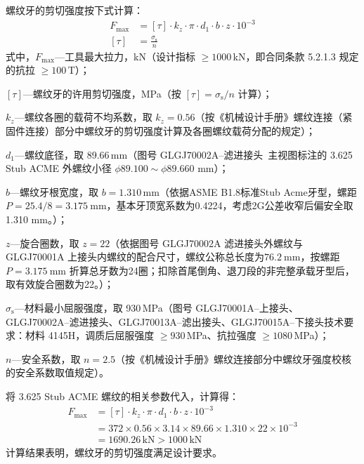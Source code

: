 螺纹牙的剪切强度按下式计算：
\begin{equation}
    \begin{aligned}
        F_{\max} &= [\tau] \cdot k_z \cdot \pi \cdot d_1 \cdot b \cdot z \cdot 10^{-3} \\
        [\tau] &= \frac{\sigma_{\mathrm{s}}}{n}
    \end{aligned}
\end{equation}
式中，$F_{\max}$---工具最大拉力，kN（设计指标 $\ge 1000$\,kN，即合同条款 5.2.1.3 规定的抗拉 $\ge 100$\,T）；

$[\tau]$---螺纹牙的许用剪切强度，MPa（按 $[\tau]=\sigma_{\mathrm{s}}/n$ 计算）；

$k_z$---螺纹各圈的载荷不均系数，取 $k_z = 0.56$（按《机械设计手册》螺纹连接（紧固件连接）部分中螺纹牙的剪切强度计算及各圈螺纹载荷分配的规定\cite{ref26}）；

$d_1$---螺纹底径，取 89.66\,mm（图号 GLGJ70002A--滤进接头\ 主视图标注的 3.625 Stub ACME 外螺纹小径 $\phi 89.100\sim \phi 89.660$ mm）；

$b$---螺纹牙根宽度，取 $b = 1.310\,\text{mm}$（依据ASME B1.8标准Stub Acme牙型，螺距 $P=25.4/8=3.175\ \mathrm{mm}$，基本牙顶宽系数为0.4224，考虑2G公差收窄后偏安全取1.310 mm。）；

$z$---旋合圈数，取 $z = 22$（依据图号 GLGJ70002A 滤进接头外螺纹与 GLGJ70001A 上接头内螺纹的配合尺寸，螺纹公称总长度为$76.2\ \mathrm{mm}$，按螺距 $P=3.175\ \mathrm{mm}$ 折算总牙数为24圈；扣除首尾倒角、退刀段的非完整承载牙型后，取有效旋合圈数为22。）；

$\sigma_{\mathrm{s}}$---材料最小屈服强度，取 930\,MPa（图号 GLGJ70001A--上接头、GLGJ70002A--滤进接头、GLGJ70013A--滤出接头、GLGJ70015A--下接头技术要求：材料 4145H，调质后屈服强度 $\ge 930$\,MPa、抗拉强度 $\ge 1080$\,MPa）；

$n$---安全系数，取 $n = 2.5$（按《机械设计手册》螺纹连接部分中螺纹牙强度校核的安全系数取值规定\cite{ref26}）。

将 3.625 Stub ACME 螺纹的相关参数代入，计算得：
\begin{equation}
    \begin{aligned}
        F_{\max} &= [\tau] \cdot k_z \cdot \pi \cdot d_1 \cdot b \cdot z \cdot 10^{-3} \\
                &= 372 \times 0.56 \times 3.14 \times 89.66 \times 1.310 \times 22 \times 10^{-3} \\
                &= 1690.26\,\text{kN} > 1000\,\text{kN}
    \end{aligned}
\end{equation}
计算结果表明，螺纹牙的剪切强度满足设计要求。


